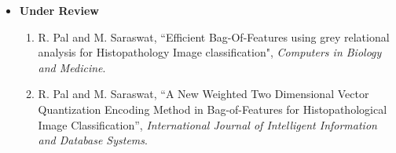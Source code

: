 \begin{itemize}
\vspace{1cm}

\item \textbf{Under Review}
\begin{enumerate}
 \item  R. Pal and M. Saraswat, ``Efficient Bag-Of-Features using grey relational analysis for Histopathology Image classification", \emph{Computers in Biology and Medicine}. 
\item   R. Pal and M. Saraswat, ``A New Weighted Two Dimensional Vector Quantization Encoding Method in Bag-of-Features for Histopathological Image Classification'', \emph{International Journal of Intelligent Information and Database Systems}. 
\end{enumerate}
\end{itemize}


